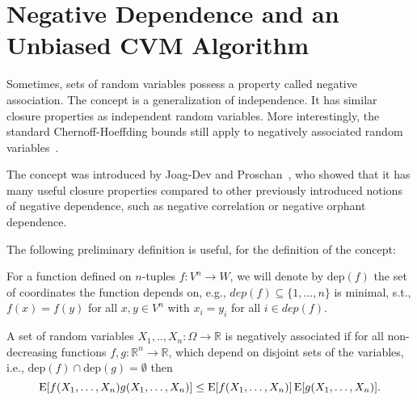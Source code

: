 \section{Negative Dependence and an Unbiased CVM Algorithm\label{sec:negdep}}
Sometimes, sets of random variables possess a property called negative association.
The concept is a generalization of independence.
It has similar closure properties as independent random variables.
More interestingly, the standard Chernoff-Hoeffding bounds still apply to negatively associated random variables~\cite[Prop. 7]{dubhashi1998}.

The concept was introduced by Joag-Dev and Proschan~\cite{joagdev1983}, who showed that it has many useful closure properties compared to other previously introduced notions of negative dependence, such as negative correlation or negative orphant dependence. 

The following preliminary definition is useful, for the definition of the concept:
\begin{definition}
For a function defined on $n$-tuples $f: V^n \rightarrow W$, we will denote by $\mathrm{dep}(f)$ the set of coordinates the function depends on, e.g., $dep(f) \subseteq \{1,\ldots,n\}$ is minimal, s.t., $f(x) = f(y)$ for all $x, y \in V^n$ with $x_i = y_i$ for all $i \in dep(f)$.
\end{definition}

\begin{definition}\label{def:neg_assoc}
A set of random variables $X_1,..,X_n: \Omega \rightarrow \mathbb R$ is negatively associated if for all non-decreasing functions $f,g: \mathbb R^n \rightarrow \mathbb R$, which depend on disjoint sets of the variables, i.e., $\mathrm{dep}(f) \cap \mathrm{dep}(g) = \emptyset$ then
\[
\operatorname{\mathrm{E}} [f(X_1,\ldots,X_n) g(X_1,\ldots,X_n)] \leq \operatorname{\mathrm{E}} [f(X_1,\ldots,X_n)] \operatorname{\mathrm{E}} [g(X_1,\ldots,X_n)] \textrm{.}
\]
\end{definition}

